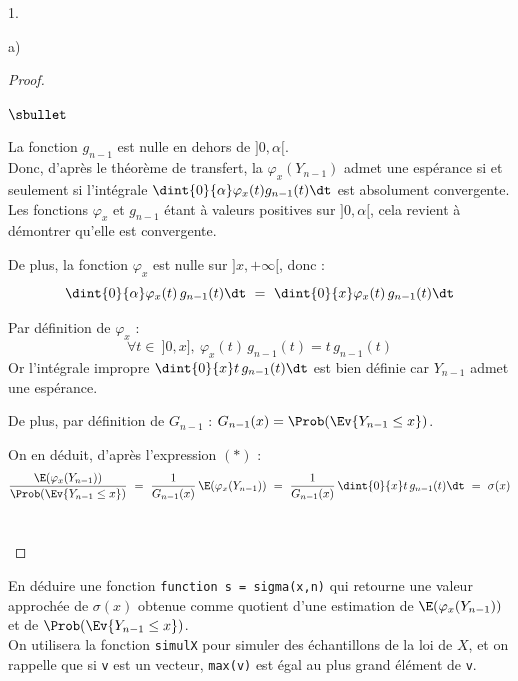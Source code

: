 \begin{noliste}{1.}
\begin{noliste}{a)}
    \begin{proof}~
      \begin{noliste}{$\sbullet$}
	\item La fonction $g_{n-1}$ est nulle en dehors de $]0,
	\alpha[$.\\
	Donc, d'après le théorème de transfert, la \var $\varphi_x(
	Y_{n-1})$ admet une espérance si et seulement si l'intégrale
	$\dint{0}{\alpha} \varphi_x(t) g_{n-1}(t) \dt$ est 
	absolument convergente.\\[.1cm]
	Les fonctions $\varphi_x$ et $g_{n-1}$ étant à valeurs 
	positives sur $]0,\alpha[$, cela revient à démontrer qu'elle 
	est convergente.
	
	\item De plus, la fonction $\varphi_x$ est nulle sur $]x,
	+\infty[$, donc :
	\[
	  \dint{0}{\alpha} \varphi_x(t) \, g_{n-1}(t) \dt \ = \
	  \dint{0}{x} \varphi_x(t) \, g_{n-1}(t) \dt
	\]
	
	\item Par définition de $\varphi_x$ :
	\[
	  \forall t \in \ ]0,x], \ \varphi_x(t) \, g_{n-1}(t)
	  = t \, g_{n-1}(t)
	\]
	Or l'intégrale impropre $\dint{0}{x} t \,
	g_{n-1}(t) \dt$ est bien définie car $Y_{n-1}$ admet une 
	espérance.
	
	\item De plus, par définition de $G_{n-1}$ :
	$G_{n-1}(x) = \Prob(\Ev{Y_{n-1} \leq x})$.
	
	\item On en déduit, d'après l'expression $(*)$ :
	\[
	  \dfrac{\E(\varphi_x(Y_{n-1}))}{\Prob(\Ev{Y_{n-1} \leq x})}
	  \ = \ \dfrac{1}{G_{n-1}(x)} \, \E(\varphi_x(Y_{n-1}))
	  \ = \ \dfrac{1}{G_{n-1}(x)} \, \dint{0}{x} t \, 
	  g_{n-1}(t) \dt \ = \ \sigma(x)
	\]
	~\\[-1.4cm]
      \end{noliste}
    \end{proof}
    
    
    \newpage

    
    \item En déduire une fonction \Scilab{} {\tt function s = 
    sigma(x,n)} qui retourne une valeur approchée de $\sigma(x)$
    obtenue comme quotient d'une estimation de $\E(\varphi_x(Y_{n-1}))$
    et de $\Prob(\Ev{Y_{n-1} \leq x})$.\\
    On utilisera la fonction {\tt simulX} pour simuler des 
    échantillons de la loi de $X$, et on rappelle que si {\tt v} est 
    un vecteur, {\tt max(v)} est égal au plus grand élément de 
    {\tt v}.
    

\end{noliste}
\end{noliste}
